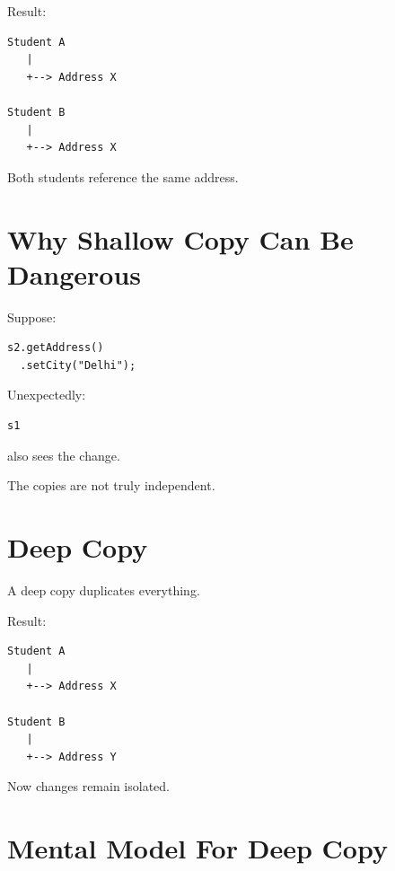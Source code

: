 \documentclass[11pt,a4paper]{book}
\begin{document}
Result:

\begin{verbatim}
Student A
   |
   +--> Address X

Student B
   |
   +--> Address X
\end{verbatim}

Both students reference the same address.


\section{Why Shallow Copy Can Be Dangerous}

Suppose:

\begin{verbatim}
s2.getAddress()
  .setCity("Delhi");
\end{verbatim}

Unexpectedly:

\begin{verbatim}
s1
\end{verbatim}

also sees the change.

The copies are not truly independent.


\section{Deep Copy}

\begin{idea}

A deep copy duplicates everything.

\end{idea}

Result:

\begin{verbatim}
Student A
   |
   +--> Address X

Student B
   |
   +--> Address Y
\end{verbatim}

Now changes remain isolated.


\section{Mental Model For Deep Copy}
\end{document}

